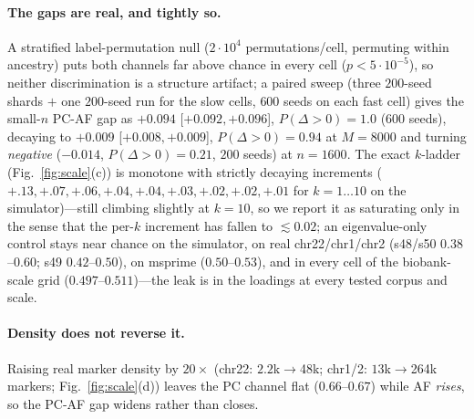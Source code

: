 \documentclass[11pt]{article}
\begin{document}
\paragraph{The gaps are real, and tightly so.} A stratified label-permutation
null ($2\cdot10^4$ permutations/cell, permuting within ancestry) puts both
channels far above chance in every cell ($p<5\cdot10^{-5}$), so neither
discrimination is a structure artifact; a paired sweep (three $200$-seed shards
$+$ one $200$-seed run for the slow cells, $600$ seeds on each fast cell) gives
the small-$n$
PC-AF gap as $+0.094$ [$+0.092,+0.096$], $P(\Delta>0){=}1.0$
($600$ seeds), decaying to $+0.009$ [$+0.008,+0.009$], $P(\Delta>0){=}0.94$ at
$M{=}8000$ and turning \emph{negative} ($-0.014$, $P(\Delta>0){=}0.21$,
$200$ seeds) at $n{=}1600$. The exact
$k$-ladder (Fig.~\ref{fig:scale}(c))
is monotone with strictly decaying increments ($+.13,+.07,+.06,+.04,+.04,+.03,
+.02,+.02,+.01$ for $k{=}1\ldots10$ on the simulator)---still climbing
slightly at $k{=}10$, so we report it as saturating only in the sense that the
per-$k$ increment has fallen to $\lesssim0.02$; an eigenvalue-only control
stays near chance on the simulator, on real chr22/chr1/chr2
(s48/s50 $0.38$--$0.60$; s49 $0.42$--$0.50$), on
msprime
($0.50$--$0.53$), and in every cell of the biobank-scale grid
($0.497$--$0.511$)---the leak is in the loadings at every tested corpus and
scale.

\paragraph{Density does not reverse it.} Raising real marker density by $20\times$
(chr22: $2.2$k$\to$48k; chr1/2: $13$k$\to$264k markers;
Fig.~\ref{fig:scale}(d)) leaves the PC channel flat ($0.66$--$0.67$) while AF
\emph{rises}, so the PC-AF gap widens rather than closes.
\end{document}
